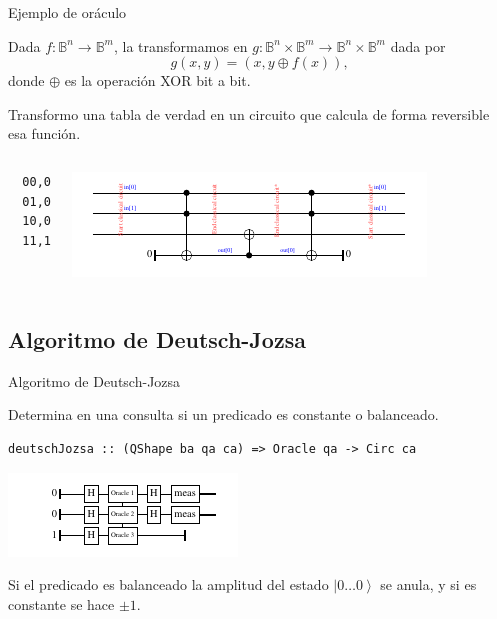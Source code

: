 \documentclass[ignorenonframetext,aspectratio=43,]{beamer}
\newcommand{\ket}[1]{\left|#1\right\rangle}
\newcommand{\BB}{\mathbb{B}}
\begin{document}
\begin{frame}[fragile]{Ejemplo de oráculo}

Dada $f: \BB^n \to \BB^m$, la transformamos en $g:\BB^{n}\times \BB^m \to \BB^{n} \times \BB^m$ dada por $$g(x,y) = (x,y \oplus f(x)),$$ donde $\oplus$ es la operación XOR bit a bit.


Transformo una tabla de verdad en un circuito que calcula de forma reversible esa función.

\begin{columns}[c] %
\begin{verbatim}
  00,0
  01,0
  10,0
  11,1
\end{verbatim}

  \includegraphics[width=.85\textwidth]{img/circuito}
\end{columns}


\end{frame}

\subsection{Algoritmo de Deutsch-Jozsa}

\begin{frame}[fragile]{Algoritmo de Deutsch-Jozsa}

  Determina en una consulta si un predicado es constante o balanceado.

\begin{lstlisting}
deutschJozsa :: (QShape ba qa ca) => Oracle qa -> Circ ca
\end{lstlisting}

\includegraphics[width=\textwidth]{img/deutsch}

Si el predicado es balanceado la amplitud del estado $\ket{0\dots 0}$ se anula,
y si es constante se hace $\pm1$.


\end{frame}
\end{document}
